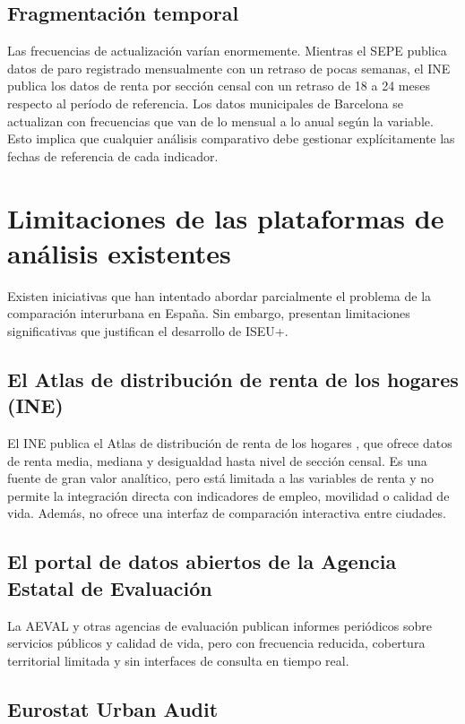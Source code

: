 \subsection{Fragmentación temporal}

Las frecuencias de actualización varían enormemente. Mientras el SEPE publica datos de paro registrado mensualmente con un retraso de pocas semanas, el INE publica los datos de renta por sección censal con un retraso de 18 a 24 meses respecto al período de referencia. Los datos municipales de Barcelona se actualizan con frecuencias que van de lo mensual a lo anual según la variable. Esto implica que cualquier análisis comparativo debe gestionar explícitamente las fechas de referencia de cada indicador.

\section{Limitaciones de las plataformas de análisis existentes}

Existen iniciativas que han intentado abordar parcialmente el problema de la comparación interurbana en España. Sin embargo, presentan limitaciones significativas que justifican el desarrollo de ISEU+.

\subsection{El Atlas de distribución de renta de los hogares (INE)}

El INE publica el Atlas de distribución de renta de los hogares \parencite{INE2023Atlas}, que ofrece datos de renta media, mediana y desigualdad hasta nivel de sección censal. Es una fuente de gran valor analítico, pero está limitada a las variables de renta y no permite la integración directa con indicadores de empleo, movilidad o calidad de vida. Además, no ofrece una interfaz de comparación interactiva entre ciudades.

\subsection{El portal de datos abiertos de la Agencia Estatal de Evaluación}

La AEVAL y otras agencias de evaluación publican informes periódicos sobre servicios públicos y calidad de vida, pero con frecuencia reducida, cobertura territorial limitada y sin interfaces de consulta en tiempo real.

\subsection{Eurostat Urban Audit}

